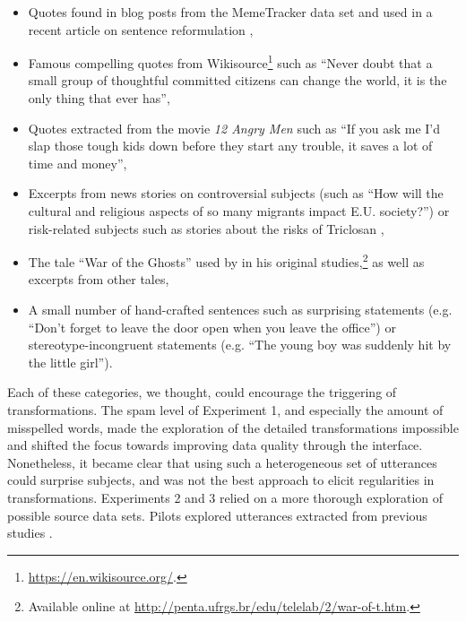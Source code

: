 \documentclass[a4paper,fleqn]{cas-dc}
\begin{document}
\begin{itemize}
\item
  Quotes found in blog posts from the MemeTracker data set \citep{leskovec_meme-tracking_2009} and used in a recent article on sentence reformulation \citep{lerique-2018-semantic-drift},
\item
  Famous compelling quotes from Wikisource\footnote{\url{https://en.wikisource.org/}.}
  such as \enquote{Never doubt that a small group of thoughtful
  committed citizens can change the world, it is the only thing that
  ever has},
\item
  Quotes extracted from the movie \emph{12 Angry Men} such as
  \enquote{If you ask me I'd slap those tough kids down before they
  start any trouble, it saves a lot of time and money},
\item
  Excerpts from news stories on controversial subjects (such as
  \enquote{How will the cultural and religious aspects of so many
  migrants impact E.U. society?}) or risk-related subjects such as
  stories about the risks of Triclosan \citep%
{moussaid_amplification_2015},
\item
  The tale \enquote{War of the Ghosts} used by
  \citet{bartlett_remembering:_1995} in his original
  studies,\footnote{Available online at
    \url{http://penta.ufrgs.br/edu/telelab/2/war-of-t.htm}.} as well as
  excerpts from other tales,
\item
  A small number of hand-crafted sentences such as surprising statements
  (\hbox{e.g.} \enquote{Don't forget to leave the door open when you leave the
  office}) or stereotype-incongruent statements (\hbox{e.g.} \enquote{The young
  boy was suddenly hit by the little girl}).
\end{itemize}

Each of these categories, we thought, could encourage the triggering of
transformations. The spam level of Experiment 1, and especially the
amount of misspelled words, made the exploration of the detailed
transformations impossible and shifted the focus towards improving data
quality through the interface. Nonetheless, it became clear that using
such a heterogeneous set of utterances could surprise subjects, and was
not the best approach to elicit regularities in transformations.
Experiments 2 and 3 relied on a more thorough exploration of possible
source data sets. Pilots explored utterances extracted from previous
studies \citetext{\citealp{bangerter_transformation_2000} on personification and increased
stereotypes, \citealp{heath_emotional_2001} on the role of disgust, \citealp{maxwell_remembering_1936} on incoherent stories, \citealp{mesoudi_bias_2006} for the role of social information}.
\end{document}
